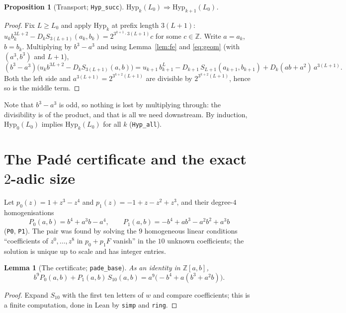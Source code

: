 \documentclass[11pt]{article}
\newtheorem{lemma}[theorem]{Lemma}
\newtheorem{proposition}[theorem]{Proposition}
\theoremstyle{definition}
\newcommand{\Z}{\mathbb{Z}}
\newcommand{\code}[1]{\texttt{#1}}
\begin{document}
\begin{proposition}[Transport; \code{Hyp\_succ}]\label{prop:transport}
$\mathrm{Hyp}_k(L_0) \Rightarrow \mathrm{Hyp}_{k+1}(L_0)$.
\end{proposition}

\begin{proof}
Fix $L \ge L_0$ and apply $\mathrm{Hyp}_k$ at prefix length $3(L+1)$:
$u_k b_k^{3L+2} - D_k S_{3(L+1)}(a_k,b_k) = 2^{3^{k+1}\cdot 3(L+1)}c$
for some $c \in \Z$. Write $a = a_k$, $b = b_k$. Multiplying by
$b^3 - a^3$ and using Lemma~\ref{lem:fe} and \eqref{eq:geom} (with
$(a^3,b^3)$ and $L+1$),
\[
(b^3 - a^3)\big(u_k b^{3L+2} - D_k S_{3(L+1)}(a,b)\big)
= u_{k+1}\, b_{k+1}^{L} - D_{k+1}\, S_{L+1}(a_{k+1}, b_{k+1})
+ D_k (ab + a^2)\, a^{3(L+1)}.
\]
Both the left side and $a^{3(L+1)} = 2^{3^{k+2}(L+1)}$ are divisible
by $2^{3^{k+2}(L+1)}$, hence so is the middle term.
\end{proof}

Note that $b^3 - a^3$ is odd, so nothing is lost by multiplying
through: the divisibility is of the product, and that is all we need
downstream. By induction, $\mathrm{Hyp}_0(L_0)$ implies
$\mathrm{Hyp}_k(L_0)$ for all $k$ (\code{Hyp\_all}).

\section{The Pad\'e certificate and the exact $2$-adic size}
\label{sec:pade}

Let $p_0(z) = 1 + z^3 - z^4$ and $p_1(z) = -1 + z - z^2 + z^3$, and
their degree-$4$ homogenisations
\[
P_0(a,b) = b^4 + a^3 b - a^4, \qquad
P_1(a,b) = -b^4 + a b^3 - a^2 b^2 + a^3 b
\]
(\code{P0}, \code{P1}). The pair was found by solving the $9$
homogeneous linear conditions ``coefficients of $z^0, \ldots, z^8$ in
$p_0 + p_1 F$ vanish'' in the $10$ unknown coefficients; the solution
is unique up to scale and has integer entries.

\begin{lemma}[The certificate; \code{pade\_base}]\label{lem:pade}
As an identity in $\Z[a,b]$,
\[
b^9 P_0(a,b) + P_1(a,b)\, S_{10}(a,b) = a^9\big(-b^4 + a(b^3 + a^2 b)\big).
\]
\end{lemma}

\begin{proof}
Expand $S_{10}$ with the first ten letters of $w$ and compare
coefficients; this is a finite computation, done in Lean by
\code{simp} and \code{ring}.
\end{proof}
\end{document}
